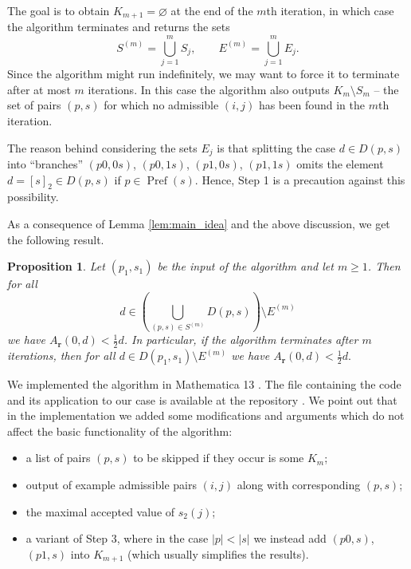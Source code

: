 \documentclass[a4paper,11pt]{amsart}
\newtheorem{prop}[thm]{Proposition}
\theoremstyle{definition}
\newcommand{\Pref}{\operatorname{Pref}}
\begin{document}
The goal is to obtain $K_{m+1} = \varnothing$ at the end of the $m$th iteration, in which case the algorithm terminates and returns the sets 
$$ S^{(m)} = \bigcup_{j=1}^m S_j, \qquad E^{(m)} = \bigcup_{j=1}^m E_j.$$
Since the algorithm might run indefinitely, we may want to force it to terminate after at most $m$ iterations. In this case the algorithm also outputs $K_m \setminus S_m$ -- the set of pairs $(p,s)$ for which no admissible $(i,j)$ has been found in the $m$th iteration.

The reason behind considering the sets $E_j$ is that splitting the case $d \in D(p,s)$ into ``branches'' $(p0,0s)$, $(p0,1s)$, $(p1,0s)$, $(p1,1s)$ omits the element $d = [s]_2 \in D(p,s)$ if $p \in \Pref(s)$. Hence, Step 1 is a precaution against this possibility. 

As a consequence of Lemma \ref{lem:main_idea} and the above discussion, we get the following result.

\begin{prop} \label{prop:algorithm_justification}
Let $(p_1,s_1)$ be the input of the algorithm and let $m \geq 1$. Then for all 
$$  d \in \left(\bigcup_{(p,s) \in S^{(m)}} D(p,s) \right) \setminus E^{(m)}$$
we have $A_{\mathbf{r}}(0,d)  < \frac{1}{2} d$. 
In particular, if the algorithm terminates after $m$ iterations, then for all $d \in D(p_1,s_1) \setminus E^{(m)}$ we have $A_{\mathbf{r}}(0,d)  < \frac{1}{2} d.$
\end{prop}

We implemented the algorithm in Mathematica 13 \cite{Mat}. The file containing the code and its application to our case is available at the repository \cite{Git}. We point out that in the implementation we added some modifications and arguments which do not affect the basic functionality of the algorithm:
\begin{itemize}
    \item a list of pairs $(p,s)$ to be skipped if they occur is some $K_m$;
    \item output of example admissible pairs $(i,j)$ along with corresponding $(p,s)$;
    \item the maximal accepted value of $s_2(j)$;
    \item a variant of Step 3, where in the case $|p|<|s|$ we instead add $(p0,s)$, $(p1,s)$ into $K_{m+1}$ (which usually simplifies the results).
\end{itemize}
\end{document}
